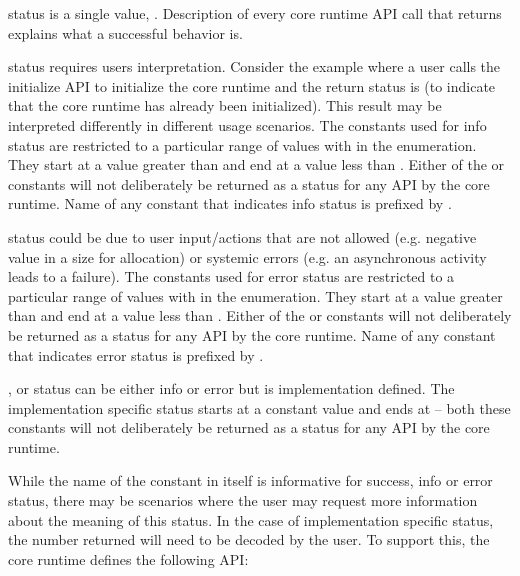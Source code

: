  status is a single value,
.  Description of every core runtime
API call that returns  explains what a
successful behavior is. 

 status requires users interpretation. Consider the
example where a user calls the initialize API to initialize the core
runtime and the return status is
 (to indicate that
the core runtime has already been initialized). This result may be
interpreted differently in different usage scenarios.  The constants
used for info status are restricted to a particular range of values
with in the  enumeration.  They start at a
value greater than  and end at a
value less than . Either of the
 or 
constants will not deliberately be returned as a status for any API
by the core runtime. Name of any constant that indicates info status
is prefixed by .

 status could be due to user input/actions that are not
allowed (e.g. negative value in a size for allocation) or systemic
errors (e.g. an asynchronous activity leads to a failure).
The constants used for error status are restricted to a particular
range of values with in the  enumeration. 
They start at a value greater than
 and end at a value less than
. Either of the
 or
 constants will not deliberately be
returned as a status for any API by the core runtime.  Name of any
constant that indicates error status is prefixed by
.

, or  status can be either
info or error but is implementation defined. The implementation
specific status starts at a constant value
 and ends at
 -- both these constants will not
deliberately be returned as a status for any API by the core
runtime.

While the name of the constant in itself is informative for success,
info or error status, there may be scenarios where the user may
request more information about the meaning of this status. In
the case of implementation specific status, the number returned will
need to be decoded by the user. To support this, the core runtime
defines the following API:

